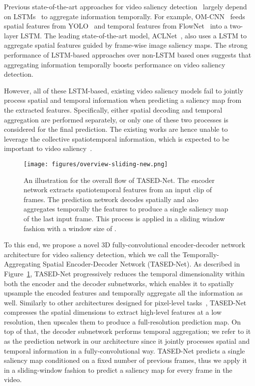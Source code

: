 \documentclass[10pt,twocolumn,letterpaper]{article}
\newcommand{\modelname}{TASED-Net}
\newcommand{\modelnamelong}{Temporally-Aggregating Spatial Encoder-Decoder}
\begin{document}
Previous state-of-the-art approaches for video saliency detection~\cite{bazzani2016recurrent, jiang2017predicting, wang2018revisiting} largely depend on LSTMs~\cite{hochreiter1997long} to aggregate information temporally. For example, OM-CNN~\cite{jiang2017predicting} feeds spatial features from YOLO~\cite{redmon2016you} and temporal features from FlowNet~\cite{dosovitskiy2015flownet} into a two-layer LSTM. The leading state-of-the-art model, ACLNet~\cite{wang2018revisiting}, also uses a LSTM to aggregate spatial features guided by frame-wise image saliency maps. The strong performance of LSTM-based approaches over non-LSTM based ones suggests that aggregating information temporally boosts performance on video saliency detection.

However, all of these LSTM-based, existing video saliency models fail to jointly process spatial and temporal information when predicting a saliency map from the extracted features. Specifically, either spatial decoding and temporal aggregation are performed separately, or only one of these two processes is considered for the final prediction. The existing works are hence unable to leverage the collective spatiotemporal information, which is expected to be important to video saliency~\cite{desimone1995neural, muller1994perceptual}.

\begin{figure}[!t]
  \centering
  \texttt{[image: figures/overview-sliding-new.png]}
  \caption{An illustration for the overall flow of \modelname{}. The encoder network extracts spatiotemporal features from an input clip of  frames. The prediction network decodes spatially and also aggregates temporally the features to produce a single saliency map of the last input frame. This process is applied in a sliding window fashion with a window size of .}
  \label{fig:overview}
\end{figure}

To this end, we propose a novel 3D fully-convolutional encoder-decoder network architecture for video saliency detection, which we call the \modelnamelong{} Network (\modelname{}). As described in Figure~\ref{fig:overview}, \modelname{} progressively reduces the temporal dimensionality within both the encoder and the decoder subnetworks, which enables it to spatially upsample the encoded features and temporally aggregate all the information as well. Similarly to other architectures designed for pixel-level tasks~\cite{badrinarayanan2015segnet, noh2015learning, ronneberger2015u}, \modelname{} compresses the spatial dimensions to extract high-level features at a low resolution, then upscales them to produce a full-resolution prediction map. On top of that, the decoder subnetwork performs temporal aggregation; we refer to it as the prediction network in our architecture since it jointly processes spatial and temporal information in a fully-convolutional way. \modelname{} predicts a single saliency map conditioned on a fixed number of previous frames, thus we apply it in a sliding-window fashion to predict a saliency map for every frame in the video.
\end{document}
